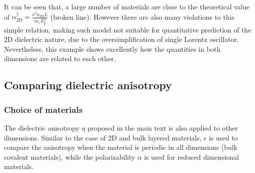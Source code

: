 \documentclass[manuscript=suppinfo,email=true,hyperref=true,keywords=false]{achemso}
\begin{document}
It can be seen that, a large number of materials are close to the
theoretical value of
$\alpha_{\mathrm{2D}}^{\parallel} = \frac{e^{2} n_{\mathrm{3D}} L}{m_{e}
  E_{\mathrm{g}}^{2}}$ (broken line). However there are also many
violations to this simple relation, making such model not suitable for
quantitative prediction of the 2D dielectric nature, due to the
oversimplification of single Lorentz oscillator. Nevertheless, this
example shows excellently how the quantities in both dimensions are
related to each other.

\subsection{Comparing dielectric anisotropy}
\label{ssec:aniso}
\subsubsection{Choice of materials}
\label{sssec:aniso-1}
The dielectric anisotropy $\eta$ proposed in the main text is also
applied to other dimensions. Similar to the case of 2D and bulk
layered materials, $\epsilon$ is used to compare the anisotropy when
the material is periodic in all dimensions (bulk covalent materials),
while the polarizability $\alpha$ is used for reduced dimensional
materials.
\end{document}
